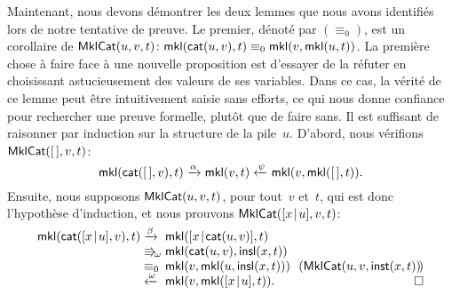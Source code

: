 Maintenant, nous devons démontrer les deux lemmes que nous avons
identifiés lors de notre tentative de preuve. Le premier, dénoté par
\((\equiv_0)\), est un corollaire de 
\(\textsf{MklCat}({u,v,t}) \colon \textsf{mkl}(\textsf{cat}(u,v),t) \equiv_0
\textsf{mkl}(v,\textsf{mkl}(u,t))\). La première chose à faire face à une
nouvelle proposition est d'essayer de la réfuter en choisissant
astucieusement des valeurs de ses variables. Dans ce cas, la vérité de
ce lemme peut être intuitivement saisie sans efforts, ce qui nous
donne confiance pour rechercher une preuve formelle, plutôt que de
faire sans. Il est suffisant de raisonner par induction sur la
structure de la pile~\(u\). D'abord, nous vérifions
\(\textsf{MklCat}({[\,],v,t})\):
\begin{equation*}
\textsf{mkl}(\textsf{cat}([\,],v),t)
  \xrightarrow{\smash{\alpha}} \textsf{mkl}(v,t)
  \xleftarrow{\smash{\psi}} \textsf{mkl}(v,\textsf{mkl}([\,],t)).
\end{equation*}
Ensuite, nous supposons \(\textsf{MklCat}({u,v,t})\), pour tout~\(v\)
et~\(t\), qui est donc l'hypothèse d'induction, et nous prouvons
\(\textsf{MklCat}({[{x}\!\mid\!{u}],v,t})\):
\begin{equation*}
  \begin{array}{@{}r@{\;}l@{\;}l@{\quad}r@{}}
      \fun{mkl}(\fun{cat}(\cons{x}{u},v),t)
& \xrightarrow{\smash{\beta}} &
  \fun{mkl}(\cons{x}{\fun{cat}(u,v)},t)\\
& \Rra{\omega} &
  \fun{mkl}(\fun{cat}(u,v),\fun{insl}(x,t))\\
& \equiv_0 & \fun{mkl}(v,\fun{mkl}(u,\fun{insl}(x,t)))
         & \!\!(\pred{MklCat}{u,v,\fun{inst}(x,t)}\!)\\
& \xleftarrow{\smash{\omega}} &
  \fun{mkl}(v,\fun{mkl}(\cons{x}{u},t)). & \hfill\Box
\end{array}
\end{equation*}

